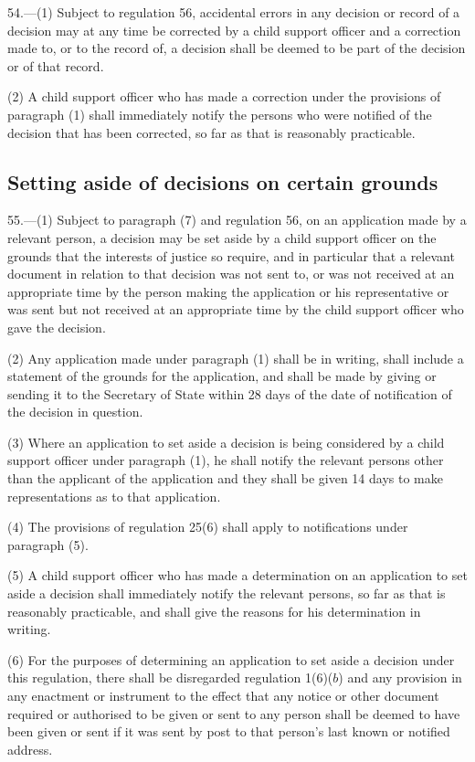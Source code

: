 \documentclass[a4paper]{article}
\begin{document}
54.—(1) Subject to regulation 56, accidental errors in any decision or record of a decision may at any time be corrected by a child support officer and a correction made to, or to the record of, a decision shall be deemed to be part of the decision or of that record.

(2) A child support officer who has made a correction under the provisions of paragraph (1) shall immediately notify the persons who were notified of the decision that has been corrected, so far as that is reasonably practicable.

\subsection[55. Setting aside of decisions on certain grounds]{Setting aside of decisions on certain grounds}

55.—(1) Subject to paragraph (7) and regulation 56, on an application made by a relevant person, a decision may be set aside by a child support officer on the grounds that the interests of justice so require, and in particular that a relevant document in relation to that decision was not sent to, or was not received at an appropriate time by the person making the application or his representative or was sent but not received at an appropriate time by the child support officer who gave the decision.

(2) Any application made under paragraph (1) shall be in writing, shall include a statement of the grounds for the application, and shall be made by giving or sending it to the Secretary of State within 28 days of the date of notification of the decision in question.

(3) Where an application to set aside a decision is being considered by a child support officer under paragraph (1), he shall notify the relevant persons other than the applicant of the application and they shall be given 14 days to make representations as to that application.

(4) The provisions of regulation 25(6) shall apply to notifications under paragraph (5).

(5) A child support officer who has made a determination on an application to set aside a decision shall immediately notify the relevant persons, so far as that is reasonably practicable, and shall give the reasons for his determination in writing.

(6) For the purposes of determining an application to set aside a decision under this regulation, there shall be disregarded regulation 1(6)($b$) and any provision in any enactment or instrument to the effect that any notice or other document required or authorised to be given or sent to any person shall be deemed to have been given or sent if it was sent by post to that person’s last known or notified address.
\end{document}
